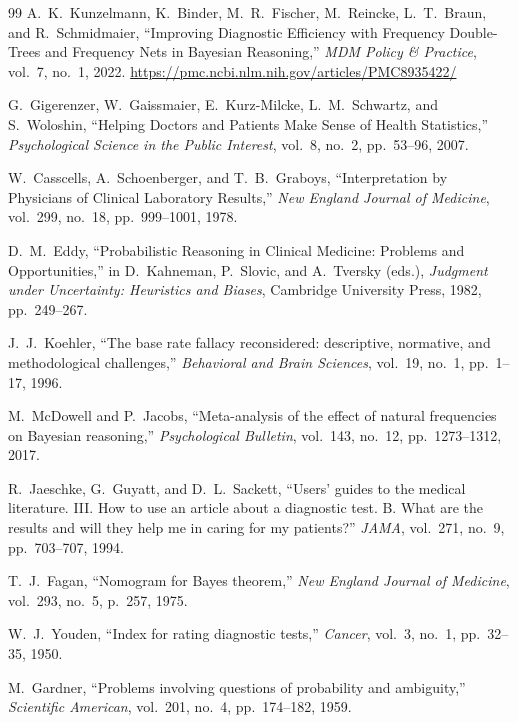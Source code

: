 \documentclass[11pt]{article}
\begin{document}
\begin{thebibliography}{99}
A.\ K.\ Kunzelmann, K.\ Binder, M.\ R.\ Fischer, M.\ Reincke, L.\ T.\ Braun, and R.\ Schmidmaier,
``Improving Diagnostic Efficiency with Frequency Double-Trees and Frequency Nets in Bayesian Reasoning,''
\emph{MDM Policy \& Practice}, vol.\ 7, no.\ 1, 2022.
\url{https://pmc.ncbi.nlm.nih.gov/articles/PMC8935422/}

G.\ Gigerenzer, W.\ Gaissmaier, E.\ Kurz-Milcke, L.\ M.\ Schwartz, and S.\ Woloshin,
``Helping Doctors and Patients Make Sense of Health Statistics,''
\emph{Psychological Science in the Public Interest}, vol.\ 8, no.\ 2, pp.\ 53--96, 2007.

W.\ Casscells, A.\ Schoenberger, and T.\ B.\ Graboys,
``Interpretation by Physicians of Clinical Laboratory Results,''
\emph{New England Journal of Medicine}, vol.\ 299, no.\ 18, pp.\ 999--1001, 1978.

D.\ M.\ Eddy,
``Probabilistic Reasoning in Clinical Medicine: Problems and Opportunities,''
in D.\ Kahneman, P.\ Slovic, and A.\ Tversky (eds.),
\emph{Judgment under Uncertainty: Heuristics and Biases},
Cambridge University Press, 1982, pp.\ 249--267.

J.\ J.\ Koehler,
``The base rate fallacy reconsidered: descriptive, normative, and methodological challenges,''
\emph{Behavioral and Brain Sciences}, vol.\ 19, no.\ 1, pp.\ 1--17, 1996.

M.\ McDowell and P.\ Jacobs,
``Meta-analysis of the effect of natural frequencies on Bayesian reasoning,''
\emph{Psychological Bulletin}, vol.\ 143, no.\ 12, pp.\ 1273--1312, 2017.

R.\ Jaeschke, G.\ Guyatt, and D.\ L.\ Sackett,
``Users' guides to the medical literature. III. How to use an article about a diagnostic test. B. What are the results and will they help me in caring for my patients?''
\emph{JAMA}, vol.\ 271, no.\ 9, pp.\ 703--707, 1994.

T.\ J.\ Fagan,
``Nomogram for Bayes theorem,''
\emph{New England Journal of Medicine}, vol.\ 293, no.\ 5, p.\ 257, 1975.

W.\ J.\ Youden,
``Index for rating diagnostic tests,''
\emph{Cancer}, vol.\ 3, no.\ 1, pp.\ 32--35, 1950.

M.\ Gardner,
``Problems involving questions of probability and ambiguity,''
\emph{Scientific American}, vol.\ 201, no.\ 4, pp.\ 174--182, 1959.


\end{thebibliography}
\end{document}
